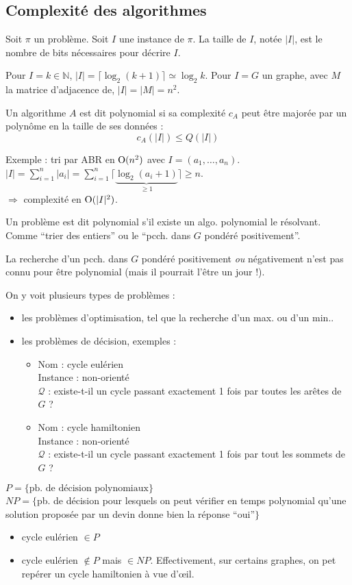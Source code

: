 \documentclass[a4paper, 8pt]{article}
\begin{document}
\begin{multicols*}{3}
\section*{Complexité des algorithmes}

Soit $\pi$ un problème. Soit $I$ une instance de $\pi$. La taille de $I$, notée $|I|$, est le nombre de bits nécessaires pour décrire $I$.

Pour $I = k\in\mathbb{N}$, $|I| = \lceil\log_2(k+1)\rceil \simeq \log_2 k$. Pour $I = G$ un graphe, avec $M$ la matrice d'adjacence de, $|I| = |M| = n^2$. 

Un algorithme $A$ est dit polynomial si sa complexité $c_A$ peut être majorée par un polynôme en la taille de ses données :
\[ c_A(|I|) \leqslant Q(|I|) \]

Exemple : tri par ABR en $\text{O}(n^2)$ avec $I = (a_1,\ldots, a_n)$. $|I| = \sum_{i=1}^n{|a_i|} =\sum_{i=1}^n{\lceil\underbrace{\log_2(a_i+1)}_{\geqslant 1}\rceil} \geqslant n$.\\
$\Rightarrow$ complexité en $\text{O}(|I|^2)$.
\medskip

Un problème est dit polynomial s'il existe un algo. polynomial le résolvant. Comme \enquote{trier des entiers} ou le  \enquote{pcch. dans $G$ pondéré positivement}.

La recherche d'un pcch. dans $G$ pondéré positivement \emph{ou} négativement n'est pas connu pour être polynomial (mais il pourrait l'être un jour !).

On y voit plusieurs types de problèmes :
\begin{itemize}
	\item les problèmes d'optimisation, tel que la recherche 		d'un max. ou d'un min..
	\item les problèmes de décision, exemples :
	\begin{itemize}
		\item Nom : cycle eulérien\\
		Instance : \GXA non-orienté\\
		$\mathcal{Q}$ : existe-t-il un cycle passant exactement 1 fois par toutes les arêtes de $G$ ?
		\item Nom : cycle hamiltonien\\
		Instance : \GXA non-orienté\\
		$\mathcal{Q}$ : existe-t-il un cycle passant exactement 1 fois par tout les sommets de $G$ ?
	\end{itemize}
\end{itemize}

$P = \{\text{pb. de décision polynomiaux}\}$\\
$N\!P = \{$pb. de décision pour lesquels on peut vérifier en temps polynomial qu'une solution proposée par un devin donne bien la réponse \enquote{oui}$\}$
\begin{itemize}
	\item cycle eulérien $\in P$
	\item cycle eulérien $\not\in P$ mais $\in N\!P$. Effectivement, sur certains graphes, on pet repérer un cycle hamiltonien à vue d'œil.
\end{itemize}


\end{multicols*}
\end{document}
